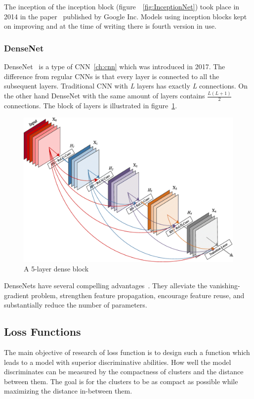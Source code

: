 The inception of the inception block (figure~~\ref{fig:InceptionNet}) took place in 2014 in the paper~\cite{GoingDeeper}
published by Google Inc.
Models using inception blocks kept on improving and at the time of writing there is fourth version in use.

\subsubsection{DenseNet}\label{subsubsec:densenet}
DenseNet~\cite{DenseNet} is a type of CNN~\ref{ch:cnn} which was introduced in 2017.
The difference from regular CNNs is that every layer is connected to all the subsequent layers.
Traditional CNN with \textit{L} layers has exactly \textit{L} connections.
On the other hand DenseNet with the same amount of layers contains $\frac{L\left( L+1 \right)}{2}$ connections.
The block of layers is illustrated in figure~\ref{fig:DenseNet}.

\begin{figure}[H]
    \centering
    \includegraphics[width=0.9\columnwidth]{images/face-recognition/densenet.png}
    \caption{A 5-layer dense block~\cite{DenseNet}}
    \label{fig:DenseNet}
\end{figure}

DenseNets have several compelling advantages~\cite{DenseNet}.
They alleviate the vanishing-gradient problem, strengthen feature propagation, encourage feature reuse, and
substantially reduce the number of parameters.

\subsection{Loss Functions}\label{subsec:loss-functions}
The main objective of research of loss function is to design such a function which leads to a model with superior
discriminative abilities.
How well the model discriminates can be measured by the compactness of clusters and the distance between them.
The goal is for the clusters to be as compact as possible while maximizing the distance in-between them.

